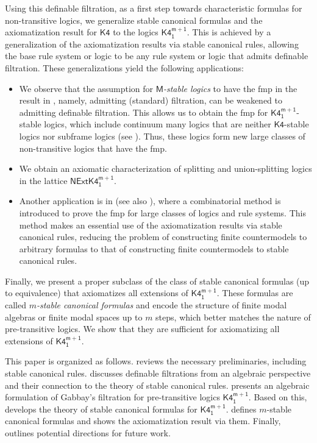 \documentclass[a4paper,11pt]{article}
\theoremstyle{definition}
\theoremstyle{remark}
\numberwithin{theorem}{section}
\newcommand{\logic}[1]{\mathsf{#1}}
\newcommand{\Kf}{\logic{K4}}
\newcommand{\Kff}[2]{\logic{K4^{#1}_{#2}}}
\newcommand{\NExt}[1]{\mathsf{NExt}{#1}}
\begin{document}
Using this definable filtration, as a first step towards characteristic formulas for non-transitive logics, we generalize stable canonical formulas and the axiomatization result for $\Kf$ \cite{stablecanonicalrules} to the logics $\Kff{m+1}{1}$. This is achieved by a generalization of the axiomatization results via stable canonical rules, allowing the base rule system or logic to be any rule system or logic that admits definable filtration. These generalizations yield the following applications:
\begin{itemize}
    \item We observe that the assumption for \emph{$\logic{M}$-stable logics} to have the fmp in the result in \cite{stablemodallogic}, namely, admitting (standard) filtration, can be weakened to admitting definable filtration. This allows us to obtain the fmp for $\Kff{m+1}{1}$-stable logics, which include continuum many logics that are neither $\Kf$-stable logics nor subframe logics (see ). Thus, these logics form new large classes of non-transitive logics that have the fmp.
    \item We obtain an axiomatic characterization of splitting and union-splitting logics in the lattice $\NExt{\Kff{m+1}{1}}$. 
    \item Another application is in \cite{takahashi2025choppingfinelyfinitecountermodels} (see also \cite[Chapter 4]{TakahashiThesis}), where a combinatorial method is introduced to prove the fmp for large classes of logics and rule systems. This method makes an essential use of the axiomatization results via stable canonical rules, reducing the problem of constructing finite countermodels to arbitrary formulas to that of constructing finite countermodels to stable canonical rules.
\end{itemize}

Finally, we present a proper subclass of the class of stable canonical formulas (up to equivalence) that axiomatizes all extensions of $\Kff{m+1}{1}$. These formulas are called \emph{$m$-stable canonical formulas} and encode the structure of finite modal algebras or finite modal spaces up to $m$ steps, which better matches the nature of pre-transitive logics. We show that they are sufficient for axiomatizing all extensions of $\Kff{m+1}{1}$.


This paper is organized as follows.  reviews the necessary preliminaries, including stable canonical rules.  discusses definable filtrations from an algebraic perspective and their connection to the theory of stable canonical rules.  presents an algebraic formulation of Gabbay's filtration for pre-transitive logics $\Kff{m+1}{1}$. Based on this,  develops the theory of stable canonical formulas for $\Kff{m+1}{1}$.  defines $m$-stable canonical formulas and shows the axiomatization result via them. Finally,  outlines potential directions for future work. 
\end{document}

